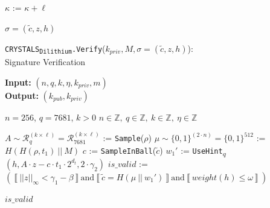 \documentclass[runningheads]{llncs}
\numberwithin{equation}{section}
\begin{document}
\begin{algorithm}
\begin{algorithmic}[1]
                \vspace{1ex}

                \State $\kappa$ := $\kappa + \ell$

                \vspace{1ex}
                
            \EndWhile
            
            \vspace{1ex}
            
            \State \Return $\sigma = \left( \tilde{c}, z, h \right)$
        \end{algorithmic}
   
    \end{algorithm}

    \begin{algorithm}
        \caption{\texorpdfstring{\texttt{CRYSTALS}\textsubscript{\texttt{Dilithium}}\texttt{.Verify}(${k}_{priv}, M, \sigma=(\tilde{c},z,h)$)}\/:\\ \phantom{...................................................................................}Signature Verification}
        \label{subrou:crystals-dilithium-verify}
        
        \textbf{Input:} $\left( n, q, k, \eta, {k}_{priv}, m \right)$\\
        \textbf{Output:} $ ( {k}_{pub}, {k}_{priv} ) $
    
        \begin{algorithmic}[1]
            \Require $n = 256$, $q = 7681$, $k > 0$
            \Ensure $n \in \mathbb{Z},\ q \in \mathbb{Z},\ k \in \mathbb{Z},\ \eta \in \mathbb{Z}$
            
            \vspace{2ex}
            
            \State $A \sim {\mathcal{R}}_{q}^{( k \times \ell )} = {\mathcal{R}}_{7681}^{( k \times \ell )}$ := \texttt{Sample}($\rho$)
            \State $\mu \sim { \{ 0 , 1 \} }^{( 2 \cdot n )} = { \{ 0 , 1 \} }^{512}$ := $H\left( H( \rho, {t}_{1} )\ ||\ M \right)$
            \State $c$ := \texttt{SampleInBall}($\tilde{c}$)
            \State ${w}_{1}'$ := \texttt{UseHint}\textsubscript{$q$}$( h, A \cdot z - c \cdot {t}_{1} \cdot {2}^{{d}_{t}}, 2 \cdot {\gamma}_{2} )$
            \State $is\_valid$ := $\left(\ \big\llbracket\ {\big|\big| z \big|\big|}_{\infty} < {\gamma}_{1} - \beta\ \big\rrbracket\ \mathrm{and}\ \big\llbracket\ \tilde{c} = H(\mu\ ||\ {w}_{1}')\ \big\rrbracket\ \mathrm{and}\ \big\llbracket\ weight(h) \leq \omega\ \big\rrbracket\ \right)$
           
            \vspace{1ex}
            
            \State \Return $is\_valid$
        \end{algorithmic}
   
    \end{algorithm}
\end{document}
